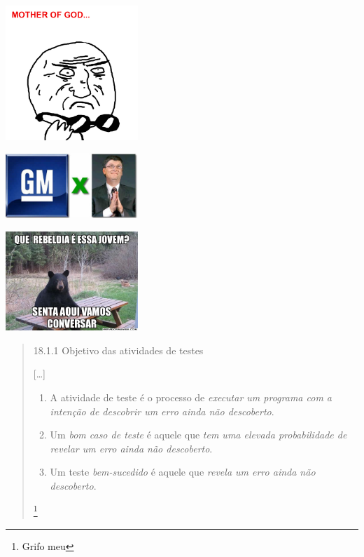 \documentclass[]{beamer}
\begin{document}
  \begin{frame}{\subsecname}
    \begin{center}
      \includegraphics[width=5cm]{images/mother-of-god}
    \end{center}
  \end{frame}

  \begin{frame}{\subsecname}
    \begin{center}
      \includegraphics[width=5cm]{images/bill_gm}
    \end{center}
  \end{frame}

  \begin{frame}{\subsecname}
    \begin{center}
      \includegraphics[width=5cm]{images/rebeldia}
    \end{center}
  \end{frame}

  \begin{frame}{\subsecname}
    \blockquote[{\cite[Pressman]{pressman_engenharia_1995}}]{
      18.1.1 Objetivo das atividades de testes

      [\ldots]
      \begin{enumerate}
        \item A atividade de teste é o processo de \emph{executar um programa com
            a intenção de descobrir um erro ainda não descoberto}.
        \item Um \emph{bom caso de teste} é aquele que \emph{tem uma elevada
          probabilidade de revelar um erro ainda não descoberto}.
        \item Um teste \emph{bem-sucedido} é aquele que \emph{revela um erro
            ainda não descoberto}.
      \end{enumerate}

      \let\thefootnote\relax\footnote{Grifo meu}
    }
  \end{frame}
\end{document}
